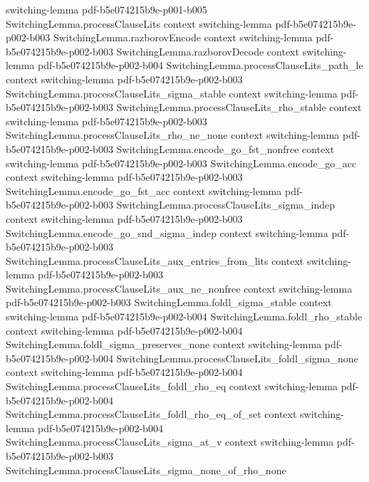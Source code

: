 \begin{lemma}
  {switching-lemma}
  {pdf-b5e074215b9e-p001-b005}
\proofstep
  {SwitchingLemma.processClauseLits}
  {context}
  {switching-lemma}
  {pdf-b5e074215b9e-p002-b003}
\proofstep
  {SwitchingLemma.razborovEncode}
  {context}
  {switching-lemma}
  {pdf-b5e074215b9e-p002-b003}
\proofstep
  {SwitchingLemma.razborovDecode}
  {context}
  {switching-lemma}
  {pdf-b5e074215b9e-p002-b004}
\proofstep
  {SwitchingLemma.processClauseLits_path_le}
  {context}
  {switching-lemma}
  {pdf-b5e074215b9e-p002-b003}
\proofstep
  {SwitchingLemma.processClauseLits_sigma_stable}
  {context}
  {switching-lemma}
  {pdf-b5e074215b9e-p002-b003}
\proofstep
  {SwitchingLemma.processClauseLits_rho_stable}
  {context}
  {switching-lemma}
  {pdf-b5e074215b9e-p002-b003}
\proofstep
  {SwitchingLemma.processClauseLits_rho_ne_none}
  {context}
  {switching-lemma}
  {pdf-b5e074215b9e-p002-b003}
\proofstep
  {SwitchingLemma.encode_go_fst_nonfree}
  {context}
  {switching-lemma}
  {pdf-b5e074215b9e-p002-b003}
\proofstep
  {SwitchingLemma.encode_go_acc}
  {context}
  {switching-lemma}
  {pdf-b5e074215b9e-p002-b003}
\proofstep
  {SwitchingLemma.encode_go_fst_acc}
  {context}
  {switching-lemma}
  {pdf-b5e074215b9e-p002-b003}
\proofstep
  {SwitchingLemma.processClauseLits_sigma_indep}
  {context}
  {switching-lemma}
  {pdf-b5e074215b9e-p002-b003}
\proofstep
  {SwitchingLemma.encode_go_snd_sigma_indep}
  {context}
  {switching-lemma}
  {pdf-b5e074215b9e-p002-b003}
\proofstep
  {SwitchingLemma.processClauseLits_aux_entries_from_lits}
  {context}
  {switching-lemma}
  {pdf-b5e074215b9e-p002-b003}
\proofstep
  {SwitchingLemma.processClauseLits_aux_ne_nonfree}
  {context}
  {switching-lemma}
  {pdf-b5e074215b9e-p002-b003}
\proofstep
  {SwitchingLemma.foldl_sigma_stable}
  {context}
  {switching-lemma}
  {pdf-b5e074215b9e-p002-b004}
\proofstep
  {SwitchingLemma.foldl_rho_stable}
  {context}
  {switching-lemma}
  {pdf-b5e074215b9e-p002-b004}
\proofstep
  {SwitchingLemma.foldl_sigma_preserves_none}
  {context}
  {switching-lemma}
  {pdf-b5e074215b9e-p002-b004}
\proofstep
  {SwitchingLemma.processClauseLits_foldl_sigma_none}
  {context}
  {switching-lemma}
  {pdf-b5e074215b9e-p002-b004}
\proofstep
  {SwitchingLemma.processClauseLits_foldl_rho_eq}
  {context}
  {switching-lemma}
  {pdf-b5e074215b9e-p002-b004}
\proofstep
  {SwitchingLemma.processClauseLits_foldl_rho_eq_of_set}
  {context}
  {switching-lemma}
  {pdf-b5e074215b9e-p002-b004}
\proofstep
  {SwitchingLemma.processClauseLits_sigma_at_v}
  {context}
  {switching-lemma}
  {pdf-b5e074215b9e-p002-b003}
\proofstep
  {SwitchingLemma.processClauseLits_sigma_none_of_rho_none}

\end{lemma}
